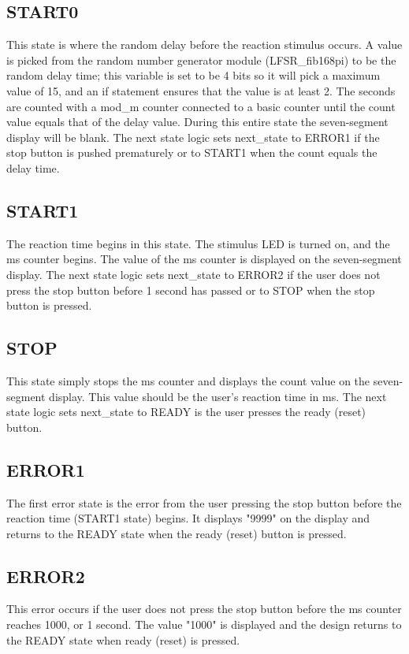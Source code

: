 \documentclass{article}
\begin{document}
\subsection{START0}
This state is where the random delay before the reaction stimulus occurs. A value is picked from the random number generator module (LFSR\_fib168pi) to be the random delay time; this variable is set to be 4 bits so it will pick a maximum value of 15, and an if statement ensures that the value is at least 2. The seconds are counted with a mod\_m counter connected to a basic counter until the count value equals that of the delay value. During this entire state the seven-segment display will be blank. The next state logic sets next\_state to ERROR1 if the stop button is pushed prematurely or to START1 when the count equals the delay time.

\subsection{START1}
The reaction time begins in this state. The stimulus LED is turned on, and the ms counter begins. The value of the ms counter is displayed on the seven-segment display. The next state logic sets next\_state to ERROR2 if the user does not press the stop button before 1 second has passed or to STOP when the stop button is pressed.

\subsection{STOP}
This state simply stops the ms counter and displays the count value on the seven-segment display. This value should be the user's reaction time in ms. The next state logic sets next\_state to READY is the user presses the ready (reset) button.

\subsection{ERROR1}
The first error state is the error from the user pressing the stop button before the reaction time (START1 state) begins. It displays "9999" on the display and returns to the READY state when the ready (reset) button is pressed.

\subsection{ERROR2}
This error occurs if the user does not press the stop button before the ms counter reaches 1000, or 1 second. The value "1000" is displayed and the design returns to the READY state when ready (reset) is pressed.
\end{document}
